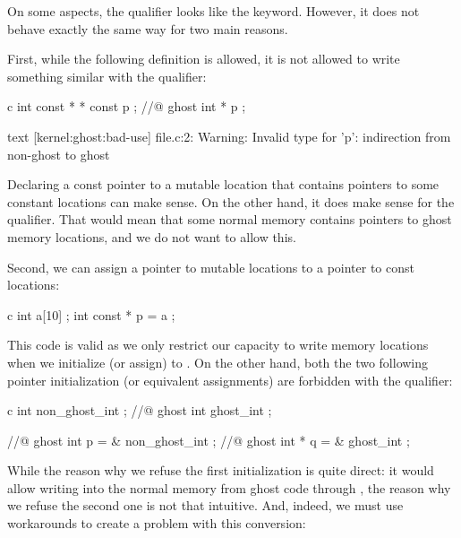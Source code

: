 

On some aspects, the  qualifier
looks like the  keyword. However, it does not
behave exactly the same way for two main reasons.


First, while the following  definition is allowed,
it is not allowed to write something similar with the
 qualifier:


\begin{CodeBlock}{c}
int const * * const p ;
//@ ghost int \ghost * * p ;
\end{CodeBlock}


\begin{CodeBlock}{text}
[kernel:ghost:bad-use] file.c:2: Warning:
  Invalid type for 'p': indirection from non-ghost to ghost
\end{CodeBlock}


Declaring a const pointer to a mutable location that contains pointers
to some constant locations can make sense. On the other hand, it does
make sense for the  qualifier. That
would mean that some normal memory contains pointers to ghost memory
locations, and we do not want to allow this.


Second, we can assign a pointer to mutable locations to a pointer to
const locations:


\begin{CodeBlock}{c}
int a[10] ;
int const * p = a ;
\end{CodeBlock}


This code is valid as we only restrict our capacity to write memory
locations when we initialize (or assign)  to .
On the other hand, both the two following pointer initialization
(or equivalent assignments) are forbidden with the
 qualifier:


\begin{CodeBlock}{c}
int non_ghost_int ;
//@ ghost int ghost_int ;

//@ ghost int \ghost * p = & non_ghost_int ;
//@ ghost int * q = & ghost_int ;
\end{CodeBlock}


While the reason why we refuse the first initialization is quite direct:
it would allow writing into the normal memory from ghost code through
, the reason why we refuse the second one is not that
intuitive. And, indeed, we must use workarounds to create a problem with
this conversion:



